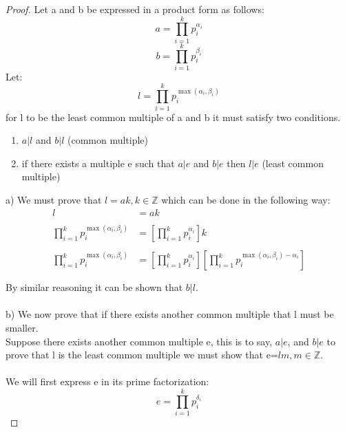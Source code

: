 \documentclass[11pt]{article}
\theoremstyle{definition}  %
\newcommand{\Z}{\mathbb{Z}}
\begin{document}
\begin{enumerate}
\begin{proof}
  Let a and b be expressed in a product form as follows:
  \[
    a=\prod_{i=1}^kp_i^{\alpha_i}
  \]
  \[
    b=\prod_{i=1}^kp_i^{\beta_i}
  \]
  Let:
  \[
    l=\prod_{i=1}^kp_i^{\max(\alpha_i,\beta_i)}
  \]
  for l to be the least common multiple of a and b it must satisfy two conditions.
  \begin{enumerate}
    \item $a|l$ and $b|l$ (common multiple)
    \item if there exists a multiple e such that $a|e$ and $b|e$ then $l|e$ (least common multiple)
  \end{enumerate}
a) We must prove that $l=ak,k\in \Z$ which can be done in the following way:
\begin{align*}
  l&=ak\\\\
  \prod_{i=1}^kp_i^{\max(\alpha_i,\beta_i)}&=\left[\prod_{i=1}^kp_i^{\alpha_i}\right]k\\\\
  \prod_{i=1}^kp_i^{\max(\alpha_i,\beta_i)}&=\left[\prod_{i=1}^kp_i^{\alpha_i}\right]\left[\prod_{i=1}^kp_i^{\max(\alpha_i,\beta_i)-\alpha_i}\right]\\\\
\end{align*}
By similar reasoning it can be shown that $b|l$.\\\\
b) We now prove that if there exists another common multiple that l must be smaller.\\
Suppose there exists another common multiple e, this is to say, $a|e$, and $b|e$ to prove that l is the least common multiple we must show that e=$lm,m\in \Z$.\\\\
We will first express e in its prime factorization:
\[
  e=\prod_{i=1}^kp_i^{\delta_i}
\]

\end{proof}
 \end{enumerate}
\end{document}
